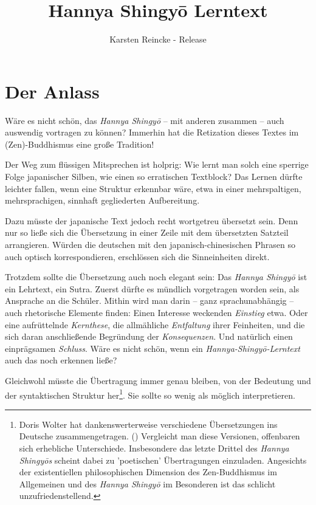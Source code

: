 \documentclass[
DIV=calc,
BCOR=5mm,
11pt,
headings=small,
oneside,
bibtotocnumbered,
english,ngerman]{scrartcl}
\begin{document}

\nocite{*}

\titlehead{Mit Dank an meine Frau für ihren wunderbaren Mut zu neuen guten
Wegen:}
\title{Hannya Shingyō Lerntext}
\author{Karsten Reincke 
 - Release  }

\maketitle
\section{Der Anlass}
 
Wäre es nicht schön, das \emph{Hannya Shingyō} -- mit anderen zusammen -- auch
auswendig vortragen zu können? Immerhin hat die Retization dieses Textes im
(Zen)-Buddhismus eine große Tradition!

Der Weg zum flüssigen Mitsprechen ist holprig: Wie lernt man solch eine sperrige
Folge japanischer Silben, wie einen so erratischen Textblock? Das Lernen dürfte
leichter fallen, wenn eine Struktur erkennbar wäre, etwa in einer
mehrspaltigen, mehrsprachigen, sinnhaft gegliederten Aufbereitung.

Dazu müsste der japanische Text jedoch recht wortgetreu übersetzt sein.
Denn nur so ließe sich die Übersetzung in einer Zeile mit dem übersetzten
Satzteil arrangieren. Würden die deutschen mit den japanisch-chinesischen
Phrasen so auch optisch korrespondieren, erschlössen sich die
Sinneinheiten direkt.

Trotzdem sollte die Übersetzung auch noch elegant sein: Das \emph{Hannya
Shingyō} ist ein Lehrtext, ein Sutra. Zuerst dürfte es mündlich vorgetragen
worden sein, als Ansprache an die Schüler. Mithin wird man darin -- ganz
sprachunabhängig -- auch rhetorische Elemente finden: Einen Interesse weckenden
\emph{Einstieg} etwa. Oder eine aufrüttelnde \emph{Kernthese}, die allmähliche
\emph{Entfaltung} ihrer Feinheiten, und die sich daran anschließende Begründung
der \emph{Konsequenzen}. Und natürlich einen einprägsamen \emph{Schluss}. Wäre es
nicht schön, wenn ein \emph{Hannya-Shingyō-Lerntext} auch das noch erkennen
ließe?

Gleichwohl müsste die Übertragung immer genau bleiben, von der Bedeutung und der
syntaktischen Struktur her\footnote{Doris Wolter hat dankenswerterweise
verschiedene Übersetzungen ins Deutsche zusammengetragen.
(\cite[vgl.][\nopage]{Wolter2010a}) Vergleicht man diese Versionen, offenbaren
sich erhebliche Unterschiede. Insbesondere das letzte Drittel des \emph{Hannya
Shingyōs} scheint dabei zu 'poetischen' Übertragungen einzuladen.
Angesichts der existentiellen philosophischen Dimension des Zen-Buddhismus im
Allgemeinen und des \emph{Hannya Shingyō} im Besonderen ist das schlicht
unzufriedenstellend.}. Sie sollte so wenig als möglich interpretieren.
\end{document}

